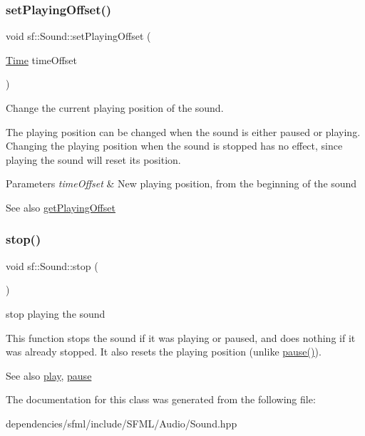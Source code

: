 \subsubsection{\texorpdfstring{set\+Playing\+Offset()}{setPlayingOffset()}}
{\footnotesize\ttfamily void sf\+::\+Sound\+::set\+Playing\+Offset (\begin{DoxyParamCaption}\item[{\hyperlink{classsf_1_1_time}{Time}}]{time\+Offset }\end{DoxyParamCaption})}



Change the current playing position of the sound. 

The playing position can be changed when the sound is either paused or playing. Changing the playing position when the sound is stopped has no effect, since playing the sound will reset its position.


\begin{DoxyParams}{Parameters}
{\em time\+Offset} & New playing position, from the beginning of the sound\\
\hline
\end{DoxyParams}
\begin{DoxySeeAlso}{See also}
\hyperlink{classsf_1_1_sound_a559bc3aea581107bcb380fdbe523aa08}{get\+Playing\+Offset} 
\end{DoxySeeAlso}
\mbox{\label{classsf_1_1_sound_aa9c91c34f7c6d344d5ee9b997511f754}} 
\subsubsection{\texorpdfstring{stop()}{stop()}}
{\footnotesize\ttfamily void sf\+::\+Sound\+::stop (\begin{DoxyParamCaption}{ }\end{DoxyParamCaption})}



stop playing the sound 

This function stops the sound if it was playing or paused, and does nothing if it was already stopped. It also resets the playing position (unlike \hyperlink{classsf_1_1_sound_a5eeb25815bfa8cdc4a6cc000b7b19ad5}{pause()}).

\begin{DoxySeeAlso}{See also}
\hyperlink{classsf_1_1_sound_a2953ffe632536e72e696fd880ced2532}{play}, \hyperlink{classsf_1_1_sound_a5eeb25815bfa8cdc4a6cc000b7b19ad5}{pause} 
\end{DoxySeeAlso}


The documentation for this class was generated from the following file\+:\begin{DoxyCompactItemize}
\item 
dependencies/sfml/include/\+S\+F\+M\+L/\+Audio/Sound.\+hpp\end{DoxyCompactItemize}
